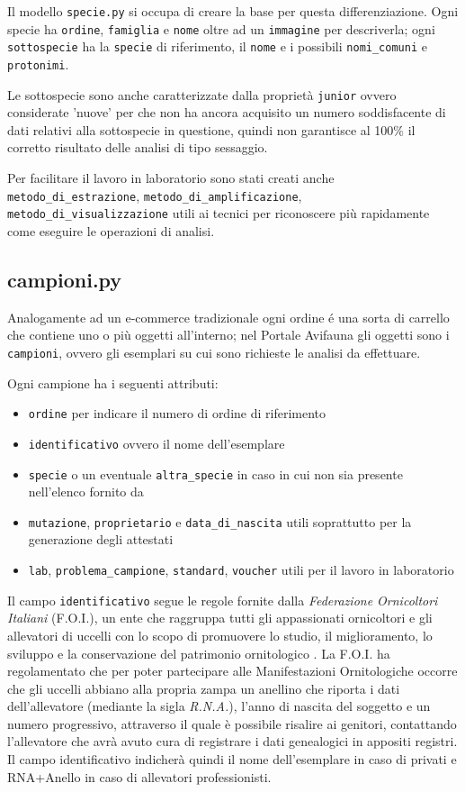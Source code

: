Il modello \texttt{specie.py} si occupa di creare la base per questa differenziazione. Ogni specie ha \texttt{ordine}, \texttt{famiglia} e \texttt{nome} oltre ad un \texttt{immagine} per descriverla; ogni \texttt{sottospecie} ha la \texttt{specie} di riferimento, il \texttt{nome} e i possibili \texttt{nomi\_comuni} e \texttt{protonimi}. 

Le sottospecie sono anche caratterizzate dalla proprietà \texttt{junior} ovvero considerate 'nuove' per {\fem} che non ha ancora acquisito un numero soddisfacente di dati relativi alla sottospecie in questione, quindi non garantisce al 100\% il corretto risultato delle analisi di tipo sessaggio. 

Per facilitare il lavoro in laboratorio sono stati creati anche \texttt{metodo\_di\_estrazione}, \texttt{metodo\_di\_amplificazione}, \texttt{metodo\_di\_visualizzazione} utili ai tecnici per riconoscere più rapidamente come eseguire le operazioni di analisi.

\subsection*{campioni.py}
\label{subs:campioni}
Analogamente ad un e-commerce tradizionale ogni ordine é una sorta di carrello che contiene uno o più oggetti all'interno; nel Portale Avifauna gli oggetti sono i \texttt{campioni}, ovvero gli esemplari su cui sono richieste le analisi da effettuare.

Ogni campione ha i seguenti attributi:
\begin{itemize}
 \item \texttt{ordine} per indicare il numero di ordine di riferimento
 \item \texttt{identificativo} ovvero il nome dell'esemplare
 \item \texttt{specie} o un eventuale \texttt{altra\_specie} in caso in cui non sia presente nell'elenco fornito da {\fem}
 \item \texttt{mutazione}, \texttt{proprietario} e \texttt{data\_di\_nascita} utili soprattutto per la generazione degli attestati
 \item \texttt{lab}, \texttt{problema\_campione}, \texttt{standard}, \texttt{voucher} utili per il lavoro in laboratorio
\end{itemize} 

Il campo \texttt{identificativo} segue le regole fornite dalla \emph{Federazione Ornicoltori Italiani} (F.O.I.), un ente che raggruppa tutti gli appassionati ornicoltori e gli allevatori di uccelli con lo scopo di promuovere lo studio, il miglioramento, lo sviluppo e la conservazione del patrimonio ornitologico \cite{foi}. La F.O.I. ha regolamentato che per poter partecipare alle Manifestazioni Ornitologiche occorre che gli uccelli abbiano alla propria zampa un anellino che riporta i dati dell'allevatore (mediante la sigla \emph{R.N.A.}), l'anno di nascita del soggetto e un numero progressivo, attraverso il quale è possibile risalire ai genitori, contattando l'allevatore che avrà avuto cura di registrare i dati genealogici in appositi registri. Il campo identificativo indicherà quindi il nome dell'esemplare in caso di privati e RNA+Anello in caso di allevatori professionisti.

